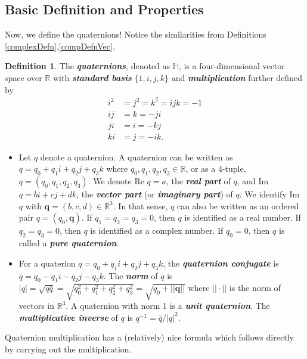 \documentclass[12pt]{article}
\theoremstyle{plain}
\theoremstyle{definition}
\newtheorem{defn}[thm]{Definition}
\begin{document}
\subsection{Basic Definition and Properties}
\label{quatProp}
Now, we define the quaternions! Notice the similarities from Definitions \ref{complexDefn},\ref{compDefnVec}.
\begin{defn}
The \textbf{\textit{quaternions}}, denoted as $\mathbb{H}$, is a four-dimensional vector space over $\mathbb{R}$ with \textbf{\textit{standard basis}} $\{1,i,j,k\}$ and \textbf{\textit{multiplication}} further defined by
\begin{align*}
    \textit{i}^2 &= \textit{j}^2 = \textit{k}^2 = \textit{ijk} = -1 \\
    \textit{ij} &= \textit{k} = -\textit{ji} \\
    \textit{ji} &= \textit{i} = -\textit{kj} \\
    \textit{ki} &= \textit{j} = -\textit{ik}.
\end{align*}
\begin{itemize}
    \item Let $q$ denote a quaternion. A quaternion can be written as $q=q_0+q_1i+q_2j+q_3k$ where $q_0,q_1,q_2,q_3\in \mathbb{R}$, or as a 4-tuple, $q=(q_0,q_1,q_2,q_3)$. We denote Re $q=a$, the \textbf{\textit{real part}} of $q$, and Im $q=bi+cj+dk$, the \textbf{\textit{vector part}} (or \textbf{\textit{imaginary part}}) of $q$. We identify Im $q$ with  $\textbf{q} = (b,c,d) \in \mathbb{R}^3$. In that sense, $q$ can also be written as an ordered pair $q=(q_0,\textbf{q})$. If $q_1=q_2=q_3=0$, then $q$ is identified as a real number. If $q_2=q_3=0$, then $q$ is identified as a complex number. If $q_0=0$, then $q$ is called a \textbf{\textit{pure quaternion}}.
    \item For a quaterion $q=q_0+q_1i+q_2j+q_3k$, the \textbf{\textit{quaternion conjugate}} is $\overline{q}=q_0-q_1i-q_2j-q_3k$. The \textbf{\textit{norm}} of $q$ is $|q|=\sqrt{q\overline{q}}=\sqrt{q_0^2+q_1^2+q_2^2+q_3^2}=\sqrt{q_0+||\textbf{q}||}$ where $||\cdot||$ is the norm of vectors in $\mathbb{R}^3$. A quaternion with norm 1 is a \textbf{\textit{unit quaternion}}. The \textbf{\textit{multiplicative inverse}} of $q$ is $q^{-1}=\overline{q}/|q|^2$. 
\end{itemize}
\end{defn}

Quaternion multiplication has a (relatively) nice formula which follows directly by carrying out the multiplication.
\end{document}

